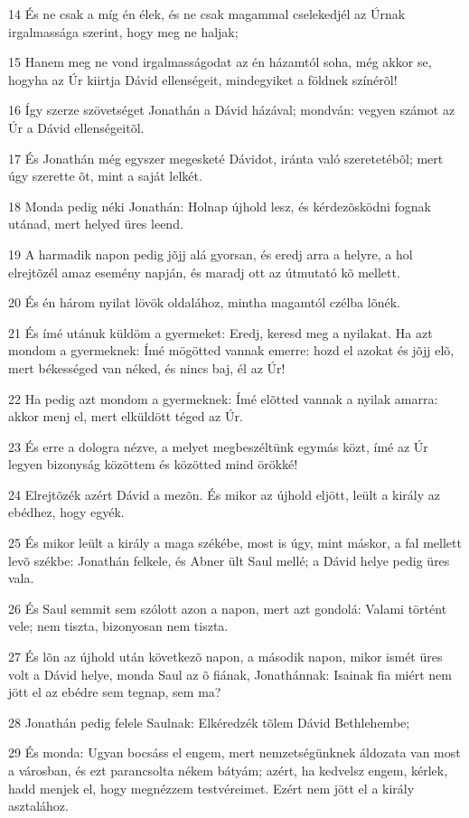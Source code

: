 \par 14 És ne csak a míg én élek, és ne csak magammal cselekedjél az Úrnak irgalmassága szerint, hogy meg ne haljak;
\par 15 Hanem meg ne vond irgalmasságodat az én házamtól soha, még akkor se, hogyha az Úr kiirtja Dávid ellenségeit, mindegyiket a földnek színérõl!
\par 16 Így szerze szövetséget Jonathán a Dávid házával; mondván: vegyen számot az Úr a Dávid ellenségeitõl.
\par 17 És Jonathán még egyszer megesketé Dávidot, iránta való szeretetébõl; mert úgy szerette õt, mint a saját lelkét.
\par 18 Monda pedig néki Jonathán: Holnap újhold lesz, és kérdezõsködni fognak utánad, mert helyed üres leend.
\par 19 A harmadik napon pedig jõjj alá gyorsan, és eredj arra a helyre, a hol elrejtõzél amaz esemény napján, és maradj ott az útmutató kõ mellett.
\par 20 És én három nyilat lövök oldalához, mintha magamtól czélba lõnék.
\par 21 És ímé utánuk küldöm a gyermeket: Eredj, keresd meg a nyilakat. Ha azt mondom a gyermeknek: Ímé mögötted vannak emerre: hozd el azokat és jõjj elõ, mert békességed van néked, és nincs baj, él az Úr!
\par 22 Ha pedig azt mondom a gyermeknek: Ímé elõtted vannak a nyilak amarra: akkor menj el, mert elküldött téged az Úr.
\par 23 És erre a dologra nézve, a melyet megbeszéltünk egymás közt, ímé az Úr legyen bizonyság közöttem és közötted mind örökké!
\par 24 Elrejtõzék azért Dávid a mezõn. És mikor az újhold eljött, leült a király az ebédhez, hogy egyék.
\par 25 És mikor leült a király a maga székébe, most is úgy, mint máskor, a fal mellett levõ székbe: Jonathán felkele, és Abner ült Saul mellé; a Dávid helye pedig üres vala.
\par 26 És Saul semmit sem szólott azon a napon, mert azt gondolá: Valami történt vele; nem tiszta, bizonyosan nem tiszta.
\par 27 És lõn az újhold után következõ napon, a második napon, mikor ismét üres volt a Dávid helye, monda Saul az õ fiának, Jonathánnak: Isainak fia miért nem jött el az ebédre sem tegnap, sem ma?
\par 28 Jonathán pedig felele Saulnak: Elkéredzék tõlem Dávid Bethlehembe;
\par 29 És monda: Ugyan bocsáss el engem, mert nemzetségünknek áldozata van most a városban, és ezt parancsolta nékem bátyám; azért, ha kedvelsz engem, kérlek, hadd menjek el, hogy megnézzem testvéreimet. Ezért nem jött el a király asztalához.
